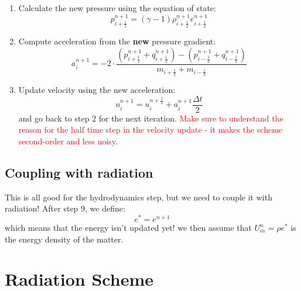 \documentclass[11pt]{article}
\begin{document}
\begin{enumerate}
\begin{equation}
  \end{equation}
  \item Calculate the new pressure using the equation of state:
  \begin{equation}
    p_{i+\frac{1}{2}}^{n+1} = (\gamma - 1) \rho_{i+\frac{1}{2}}^{n+1} e_{i+\frac{1}{2}}^{n+1}
  \end{equation}
  \item Compute acceleration from the \textbf{new} pressure gradient: 
  \begin{equation}
    a_i^{n+1} = -2 \cdot \frac{\left(p_{i+\frac{1}{2}}^{n+1} + q_{i+\frac{1}{2}}^{n+1}\right) - \left(p_{i-\frac{1}{2}}^{n+1} + q_{i-\frac{1}{2}}^{n+1}\right)}{m_{i+\frac{1}{2}} + m_{i-\frac{1}{2}}}
  \end{equation}
  \item Update velocity using the new acceleration:
  \begin{equation}
    u_i^{n+1} = u_i^{n+\frac{1}{2}} + a_i^{n+1} \frac{\Delta t}{2}
  \end{equation}
  and go back to step 2 for the next iteration. \textcolor{red}{Make sure to understand the reason for the half time step in the velocity update - it makes the scheme second-order and less noisy}.
\end{enumerate}
\subsection{Coupling with radiation}
This is all good for the hydrodynamics step, but we need to couple it with radiation! After step 9, we define:
\begin{equation}
  e^{*} = e^{n+1} 
\end{equation}
which means that the energy isn't updated yet! we then assume that $U_m^{n} = \rho e^{*}$ is the energy density of the matter.

\section{Radiation Scheme}
\end{document}
